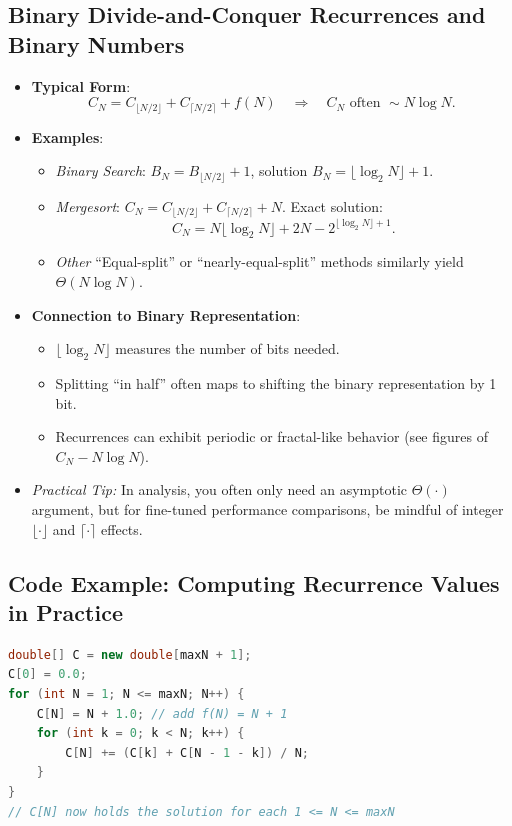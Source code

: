 \documentclass[11pt,letterpaper]{article}
\begin{document}
\subsection{Binary Divide-and-Conquer Recurrences and Binary Numbers}
\begin{itemize}
  \item \textbf{Typical Form}:
    \[
      C_N = C_{\lfloor N/2 \rfloor} + C_{\lceil N/2 \rceil} + f(N)
      \quad\Longrightarrow\quad C_N \text{ often } \sim N \log N.
    \]
  \item \textbf{Examples}:
    \begin{itemize}
      \item \emph{Binary Search}: \(B_N = B_{\lfloor N/2 \rfloor} + 1\), solution \(B_N = \lfloor \log_2 N \rfloor + 1.\)
      \item \emph{Mergesort}: \(C_N = C_{\lfloor N/2\rfloor} + C_{\lceil N/2\rceil} + N.\) Exact solution:
        \[
          C_N = N \lfloor \log_2 N \rfloor + 2N - 2^{\lfloor \log_2 N\rfloor +1}.
        \]
      \item \emph{Other} “Equal-split” or “nearly-equal-split” methods similarly yield \(\Theta(N \log N)\).
    \end{itemize}
  \item \textbf{Connection to Binary Representation}: 
    \begin{itemize}
      \item \(\lfloor \log_2 N \rfloor\) measures the number of bits needed.
      \item Splitting “in half” often maps to shifting the binary representation by 1 bit.
      \item Recurrences can exhibit periodic or fractal-like behavior (see figures of \(C_N - N \log N\)).
    \end{itemize}
  \item \emph{Practical Tip:} In analysis, you often only need an asymptotic \(\Theta(\cdot)\) argument, but for fine-tuned performance comparisons, be mindful of integer \(\lfloor \cdot \rfloor\) and \(\lceil \cdot \rceil\) effects.
\end{itemize}

\subsection{Code Example: Computing Recurrence Values in Practice}
\label{prog:recurrence}
\begin{lstlisting}[language=Java]
double[] C = new double[maxN + 1];
C[0] = 0.0;
for (int N = 1; N <= maxN; N++) {
    C[N] = N + 1.0; // add f(N) = N + 1
    for (int k = 0; k < N; k++) {
        C[N] += (C[k] + C[N - 1 - k]) / N;
    }
}
// C[N] now holds the solution for each 1 <= N <= maxN
\end{lstlisting}
\end{document}
